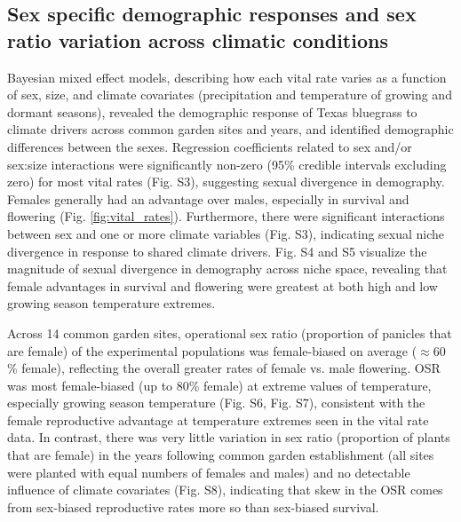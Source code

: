 \documentclass[9pt,twocolumn,twoside,lineno]{pnas-new}
\newcommand{\tom}[2]{{\color{red}{#1}}\footnote{\textit{\color{red}{#2}}}}
\begin{document}
\subsection*{Sex specific demographic responses and sex ratio variation across climatic conditions}
Bayesian mixed effect models, describing how each vital rate varies as a function of sex, size, and climate covariates (precipitation and temperature of growing and dormant seasons), revealed the demographic response of Texas bluegrass to climate drivers across common garden sites and years, and identified demographic differences between the sexes. 
Regression coefficients related to sex and/or sex:size interactions were significantly non-zero (95\% credible intervals excluding zero) for most vital rates (Fig. S3), suggesting sexual divergence in demography. 
Females generally had an advantage over males, especially in survival and flowering (Fig. \ref{fig:vital_rates}). 
Furthermore, there were significant interactions between sex and one or more climate variables (Fig. S3), indicating sexual niche divergence in response to shared climate drivers.  
Fig. S4 and  S5 visualize the magnitude of sexual divergence in demography across niche space, revealing that female advantages in survival and flowering  were greatest at both high and low growing season temperature extremes. 

Across 14 common garden sites, operational sex ratio (proportion of panicles that are female) of the experimental populations was female-biased on average ($\approx 60$ \% female), reflecting the overall greater rates of female vs. male flowering. 
OSR was most female-biased (up to 80\% female) at extreme values of temperature, especially growing season temperature (Fig. S6, Fig. S7), consistent with the female reproductive advantage at temperature extremes seen in the vital rate data. 
In contrast, there was very little variation in sex ratio (proportion of plants that are female) in the years following common garden establishment (all sites were planted with equal numbers of females and males) and no detectable influence of climate covariates (Fig. S8), indicating that skew in the OSR comes from sex-biased reproductive rates more so than sex-biased survival. 
\end{document}
